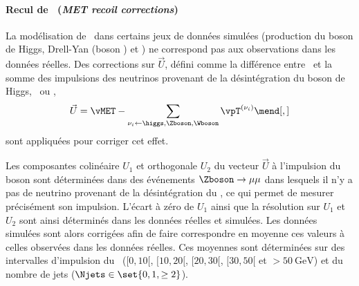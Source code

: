 \paragraph{Recul de \MET\ (\emph{MET recoil corrections})}
La modélisation de \MET\ dans certains jeux de données simulées (production du boson de Higgs, Drell-Yan (boson \Zboson) et \Wjets) ne correspond pas aux observations dans les données réelles.
Des corrections sur $\vec{U}$, défini comme la différence entre \MET\ et la somme des impulsions des neutrinos provenant de la désintégration du boson de Higgs, \Zboson\ ou \Wboson, \ie
\begin{equation}
\vec{U} = \vMET - \sum_{\nu_i \leftarrow \higgs,\Zboson,\Wboson} \vpT^{(\nu_i)}
\mend[,]
\end{equation}
sont appliquées pour corriger cet effet.
\par
Les composantes colinéaire $U_1$ et orthogonale $U_2$ du vecteur $\vec{U}$ à l'impulsion du boson sont déterminées dans des événements $\Zboson\to\mu\mu$ dans lesquels il n'y a pas de neutrino provenant de la désintégration du \Zboson, ce qui permet de mesurer précisément son impulsion.
L'écart à zéro de $U_1$ ainsi que la résolution sur $U_1$ et $U_2$ sont ainsi déterminés dans les données réelles et simulées.
Les données simulées sont alors corrigées afin de faire correspondre en moyenne ces valeurs à celles observées dans les données réelles.
Ces moyennes sont déterminées sur des intervalles d'impulsion du \Zboson\ ($[\num{0}, \num{10}[$, $[\num{10}, \num{20}[$, $[\num{20}, \num{30}[$, $[\num{30}, \num{50}[$ et $>\SI{50}{\GeV}$) et du nombre de jets ($\Njets\in\set{0, 1, \geq2}$).
